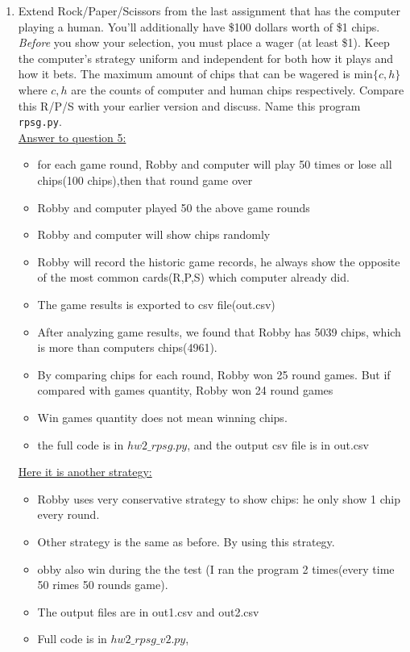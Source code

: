 \documentclass{article}
\begin{document}
\begin{enumerate}
\begin{enumerate}
\end{enumerate}
\item Extend Rock/Paper/Scissors from the last assignment that has the computer playing a human. You'll additionally have \$100 dollars worth of \$1 chips.  {\it Before} you show your selection, you must place a wager (at least \$1).  Keep the computer's strategy uniform and independent for both how it plays and how it bets.  The maximum amount of chips that can be wagered is $\mathrm{min}\{c,h\}$ where $c,h$ are the counts of computer and human chips respectively.  Compare this R/P/S with your earlier version and discuss.  Name this program \texttt{rpsg.py}. \\
\underline{Answer to question 5:}\\
\begin{itemize}
\item for each game round, Robby and computer will play 50 times or lose all chips(100 chips),then that round game over
\item Robby and computer played 50 the above game rounds
\item Robby and computer will show chips randomly
\item Robby will record the historic game records, he always show the opposite of the most common cards(R,P,S) which computer already  did.
\item The game results is exported to csv file(out.csv)
\item After analyzing game results, we found that Robby has 5039 chips, which is more than computers chips(4961).
\item By comparing chips for each round, Robby won 25 round games. But if compared with games quantity, Robby won 24 round games
\item Win games quantity does not mean winning chips.
\item the full code is in $hw2\_rpsg.py$, and the output csv file is in out.csv
\end{itemize}
\underline{Here it is another strategy:}
\begin{itemize}
\item Robby uses very conservative strategy to show chips: he only show 1 chip every round. 
\item Other strategy is the same as before. By using this strategy.
\item obby also win during the the test (I ran the program 2 times(every time 50 rimes 50 rounds game).
\item The output files are in out1.csv and out2.csv
\item Full code is in  $hw2\_rpsg\_v2.py$,
\end{itemize}
\end{enumerate}
\end{document}
